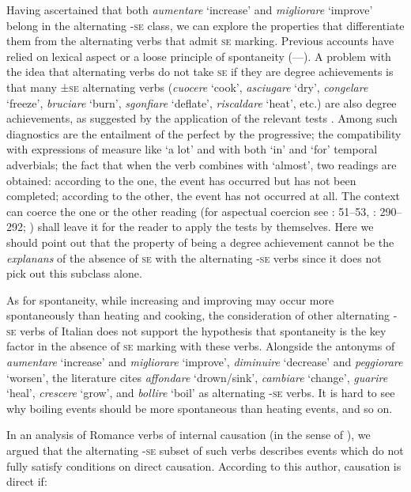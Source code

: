 \documentclass[output=paper,colorlinks,citecolor=brown
]{langscibook}
\begin{document}
Having ascertained that both \textit{aumentare} ‘increase’ and \textit{migliorare} ‘improve’ belong in the alternating -\textsc{se} class, we can explore the properties that differentiate them from the alternating verbs that admit \textsc{se} marking. Previous accounts have relied on lexical aspect or a loose principle of spontaneity (—). A problem with the idea that alternating verbs do not take \textsc{se} if they are degree achievements is that many ±\textsc{se} alternating verbs (\textit{cuocere} ‘cook’, \textit{asciugare} ‘dry’, \textit{congelare} ‘freeze’, \textit{bruciare} ‘burn’, \textit{sgonfiare} ‘deflate’, \textit{riscaldare} ‘heat’, etc.) are also degree achievements, as suggested by the application of the relevant tests \citep{dowty1979word,bertinetto1995attempt,hay1999scalar}. Among such diagnostics are the entailment of the perfect by the progressive; the compatibility with expressions of measure like ‘a lot’ and with both ‘in’ and ‘for’ temporal adverbials; the fact that when the verb combines with ‘almost’, two readings are obtained: according to the one, the event has occurred but has not been completed; according to the other, the event has not occurred at all. The context can coerce the one or the other reading (for aspectual coercion see \cite{jackendoff1997architecture}: 51--53, \cite{jackendoff2002foundations}: 290--292; \cite{pustejovsky1991syntax}) shall leave it for the reader to apply the tests by themselves. Here we should point out that the property of being a degree achievement cannot be the \textit{explanans} of the absence of \textsc{se} with the alternating -\textsc{se} verbs since it does not pick out this subclass alone. 

As for spontaneity, while increasing and improving may occur more spontaneously than heating and cooking, the consideration of other alternating -\textsc{se} verbs of Italian does not support the hypothesis that spontaneity is the key factor in the absence of \textsc{se} marking with these verbs. Alongside the antonyms of \textit{aumentare} ‘increase’ and \textit{migliorare} ‘improve’, \textit{diminuire} ‘decrease’ and \textit{peggiorare} ‘worsen’, the literature cites \textit{affondare} ‘drown/sink’, \textit{cambiare} ‘change’, \textit{guarire} ‘heal’, \textit{crescere} ‘grow’, and \textit{bollire} ‘boil’ as alternating -\textsc{se} verbs. It is hard to see why boiling events should be more spontaneous than heating events, and so on.

In an analysis of Romance verbs of internal causation (in the sense of \cite{levin1995unaccusativity}), we argued that the alternating -\textsc{se} subset of such verbs describes events which do not fully satisfy \citet[4--5]{wolff2003direct} conditions on direct causation. According to this author, causation is direct if:
\end{document}
